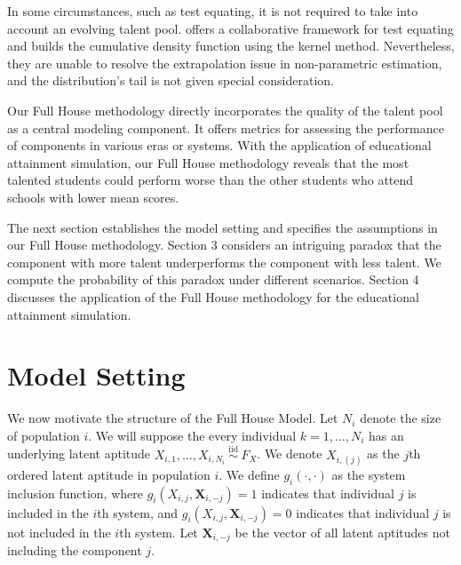 \documentclass[12pt]{article}
\begin{document}
In some circumstances, such as test equating, it is not required to take into account an evolving talent pool. \cite{andersson2013performing} offers a collaborative framework for test equating and builds the cumulative density function using the kernel method. Nevertheless, they are unable to resolve the extrapolation issue in non-parametric estimation, and the distribution's tail is not given special consideration.

Our Full House methodology directly incorporates the quality of the talent pool as a central modeling component. It offers metrics for assessing the performance of components in various eras or systems. With the application of educational attainment simulation, our Full House methodology reveals that the most talented students could perform worse than the other students who attend schools with lower mean scores. 

The next section establishes the model setting and specifies the assumptions in our Full House methodology. Section 3 considers an intriguing paradox that the component with more talent underperforms the component with less talent. We compute the probability of this paradox under different scenarios. Section 4 discusses the application of the Full House methodology for the educational attainment simulation. 


\section{Model Setting}

We now motivate the structure of the Full House Model. Let $N_i$ denote the size of population $i$. We will suppose the every individual $k = 1,\ldots, N_i$ has an underlying latent aptitude 
$X_{i,1}, \ldots, X_{i,N_i} \stackrel{\text { iid }}{\sim} F_{X}$. 
We denote $X_{i,(j)}$ as the $j$th ordered latent aptitude in population $i$.
We define $g_{i}\left(\cdot, \cdot\right)$ as the system inclusion function, where 
$g_{i}\left(X_{i,j}, \textbf{X}_{i,-j}\right)=1$ indicates that individual $j$ is included in the $i$th system, 
and $g_{i}\left(X_{i,j}, \textbf{X}_{i,-j}\right)=0$ indicates that individual $j$ is not included in the $i$th system. Let $\textbf{X}_{i,-j}$ be the vector of all latent aptitudes not including the component $j$. 

\end{document}
